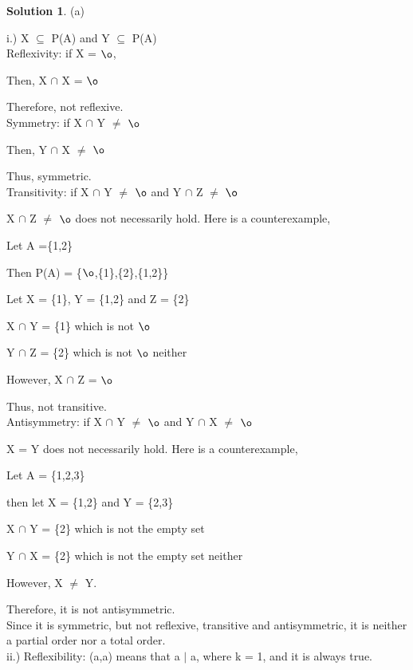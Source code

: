 \documentclass{article}
\theoremstyle{definition}
\newtheorem*{solution}{Solution}
\begin{document}
\begin{solution}
(a) 

i.) X \(\subseteq\) P(A) and Y \(\subseteq\) P(A)\\

Reflexivity: if X = \(\o\),

Then, X \(\cap\) X = \(\o\)
	
Therefore, not reflexive.\\

	
Symmetry: if X \(\cap\) Y \(\neq\) \(\o\)

Then, Y \(\cap\) X \(\neq\) \(\o\)

Thus, symmetric.\\


Transitivity: if X \(\cap\) Y \(\neq\) \(\o\) and Y \(\cap\) Z \(\neq\) \(\o\)

X \(\cap\) Z \(\neq\) \(\o\) does not necessarily hold. Here is a counterexample,

Let A =\{1,2\}

Then P(A) = \{\(\o\),\{1\},\{2\},\{1,2\}\}

Let X = \{1\}, Y = \{1,2\} and Z = \{2\}

X \(\cap\) Y = \{1\} which is not \(\o\)

Y \(\cap\) Z = \{2\} which is not \(\o\) neither

However, X \(\cap\) Z = \(\o\)

Thus, not transitive.\\


Antisymmetry: if X \(\cap\) Y \(\neq\) \(\o\) and Y \(\cap\) X \(\neq\) \(\o\)

X = Y does not necessarily hold. Here is a counterexample,

Let A = \{1,2,3\}

then let X = \{1,2\} and Y = \{2,3\}

X \(\cap\) Y = \{2\} which is not the empty set

Y \(\cap\) X = \{2\} which is not the empty set neither

However, X \(\neq\) Y.

Therefore, it is not antisymmetric.\\

Since it is symmetric, but not reflexive, transitive and antisymmetric, it is neither a partial order nor a total order.\\


ii.) Reflexibility: (a,a) means that a \(|\) a, where k = 1, and it is always true.


\end{solution}
\end{document}
